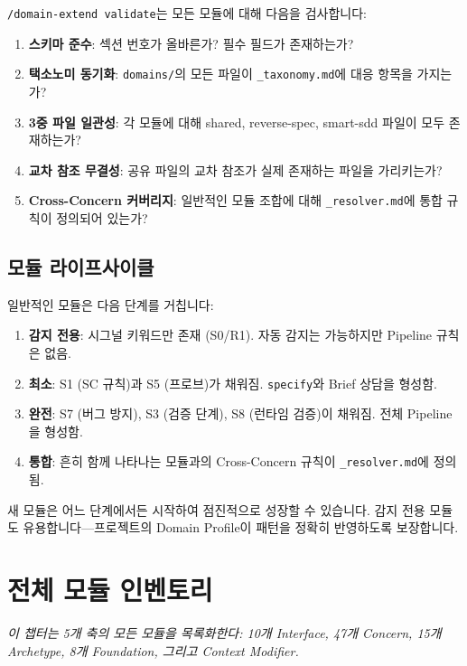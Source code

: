 \documentclass[11pt,a4paper,openright,twoside]{report}
\newcommand{\cmd}[1]{\texttt{/#1}}
\newcommand{\file}[1]{\texttt{#1}}
\begin{document}
\cmd{domain-extend validate}는 모든 모듈에 대해 다음을 검사합니다:

\begin{enumerate}
  \item \textbf{스키마 준수}: 섹션 번호가 올바른가? 필수 필드가 존재하는가?
  \item \textbf{택소노미 동기화}: \file{domains/}의 모든 파일이 \file{\_taxonomy.md}에 대응 항목을 가지는가?
  \item \textbf{3중 파일 일관성}: 각 모듈에 대해 shared, reverse-spec, smart-sdd 파일이 모두 존재하는가?
  \item \textbf{교차 참조 무결성}: 공유 파일의 교차 참조가 실제 존재하는 파일을 가리키는가?
  \item \textbf{Cross-Concern 커버리지}: 일반적인 모듈 조합에 대해 \file{\_resolver.md}에 통합 규칙이 정의되어 있는가?
\end{enumerate}

\section{모듈 라이프사이클}

일반적인 모듈은 다음 단계를 거칩니다:

\begin{enumerate}
  \item \textbf{감지 전용}: 시그널 키워드만 존재 (S0/R1). 자동 감지는 가능하지만 Pipeline 규칙은 없음.
  \item \textbf{최소}: S1 (SC 규칙)과 S5 (프로브)가 채워짐. \texttt{specify}와 Brief 상담을 형성함.
  \item \textbf{완전}: S7 (버그 방지), S3 (검증 단계), S8 (런타임 검증)이 채워짐. 전체 Pipeline을 형성함.
  \item \textbf{통합}: 흔히 함께 나타나는 모듈과의 Cross-Concern 규칙이 \file{\_resolver.md}에 정의됨.
\end{enumerate}

새 모듈은 어느 단계에서든 시작하여 점진적으로 성장할 수 있습니다. 감지 전용 모듈도 유용합니다---프로젝트의 Domain Profile이 패턴을 정확히 반영하도록 보장합니다.


\chapter{전체 모듈 인벤토리}
\label{ch:inventory}

\textit{이 챕터는 5개 축의 모든 모듈을 목록화한다: 10개 Interface, 47개 Concern, 15개 Archetype, 8개 Foundation, 그리고 Context Modifier.}
\end{document}
